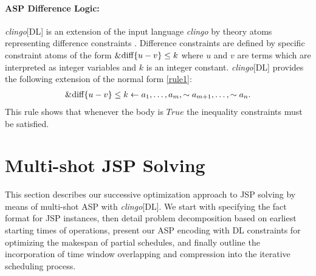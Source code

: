 \documentclass{tlp} %
\newcommand{\clingodl}{\emph{clingo}[DL]\xspace}
\begin{document}
\paragraph{ASP Difference Logic:}
\emph{clingo}[DL] is an extension of the input language \emph{clingo} by theory atoms representing difference constraints \cite{gebser2016theory,janhunen2017clingo}. Difference constraints are defined by specific constraint atoms of the form $\text{\lstinline{&diff}}\{u-v\} \leq k$ where $u$ and $v$ are terms which are interpreted as integer variables and $k$ is an integer constant. \emph{clingo}[DL] provides the following extension of the normal form \eqref{rule1}: 
\begin{align*}
	\text{\lstinline{&diff}}\{u-v\} \leq k \gets a_1, \ldots, a_m, \sim a_{m+1}, \ldots, \sim a_n.
\end{align*}
 This rule shows that whenever the body is $True$ the inequality constraints must be satisfied.

\section{Multi-shot JSP Solving}\label{sec:problem}
This section describes our successive optimization approach to
JSP solving by means of multi-shot ASP with \clingodl.
We start with specifying the fact format for JSP instances,
then detail problem decomposition based on earliest starting times of operations,
present our ASP encoding with DL constraints for optimizing the makespan of partial schedules, and
finally outline the incorporation of time window overlapping and compression
into the iterative scheduling process.   
%
\end{document}

